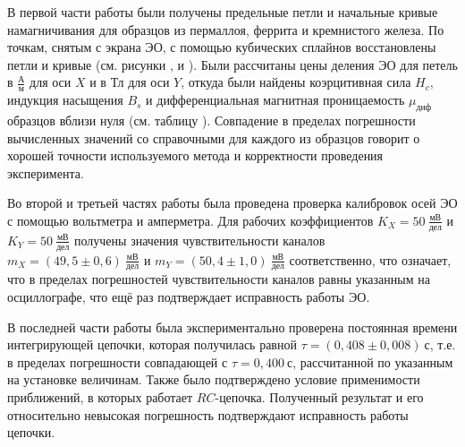 \documentclass[a4paper,10pt]{article}
\begin{document}
В первой части работы были получены предельные петли и начальные кривые намагничивания для образцов из пермаллоя, феррита и кремнистого железа. По точкам, снятым с экрана ЭО, с помощью кубических сплайнов восстановлены петли и кривые (см. рисунки ,  и ). Были рассчитаны цены деления ЭО для петель в $\frac{\text{А}}{\text{м}}$ для оси $X$ и в $\text{Тл}$ для оси $Y$, откуда были найдены коэрцитивная сила $H_c$, индукция насыщения $B_s$ и дифференциальная магнитная проницаемость $\mu_{\text{диф}}$ образцов вблизи нуля (см. таблицу ). Совпадение в пределах погрешности вычисленных значений со справочными  для каждого из образцов говорит о хорошей точности используемого метода и корректности проведения эксперимента.

Во второй и третьей частях работы была проведена проверка калибровок осей ЭО с помощью вольтметра и амперметра. Для рабочих коэффициентов $K_X=50~\frac{\text{мВ}}{\text{дел}}$ и $K_Y=50~\frac{\text{мВ}}{\text{дел}}$ получены значения чувствительности каналов $m_X=\left(49,5\pm0,6\right)~\frac{\text{мВ}}{\text{дел}}$ и $m_Y=\left(50,4\pm1,0\right)~\frac{\text{мВ}}{\text{дел}}$ соответственно, что означает, что в пределах погрешностей чувствительности каналов равны указанным на осциллографе, что ещё раз подтверждает исправность работы ЭО.

В последней части работы  была экспериментально проверена постоянная времени интегрирующей цепочки, которая получилась равной
$\tau=\left(0,408\pm0,008\right)~\text{с}$, т.е. в пределах погрешности совпадающей с $\tau=0,400~\text{с}$, рассчитанной по указанным на установке величинам. Также было подтверждено условие применимости приближений, в которых работает $RC$-цепочка. Полученный результат и его относительно невысокая погрешность подтверждают исправность работы цепочки.
\end{document}

